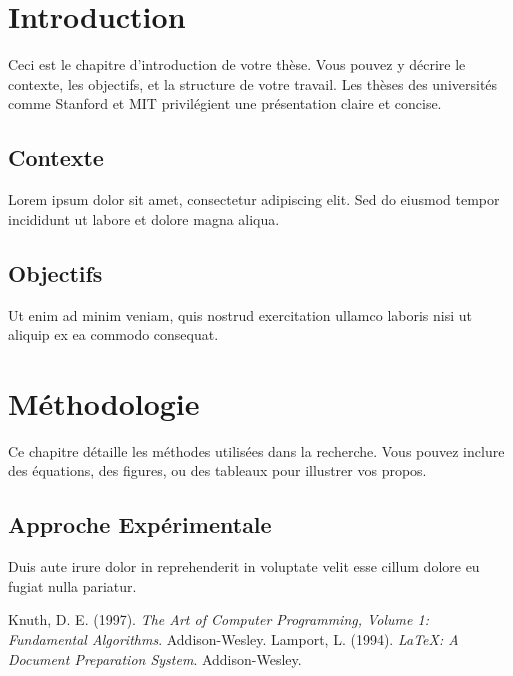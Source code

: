 \documentclass[a4paper,12pt]{report}
\begin{document}
\clearpage
\tableofcontents
\clearpage

\chapter{Introduction}
\onehalfspacing
Ceci est le chapitre d'introduction de votre thèse. Vous pouvez y décrire le contexte, les objectifs, et la structure de votre travail. Les thèses des universités comme Stanford et MIT privilégient une présentation claire et concise.

\section{Contexte}
Lorem ipsum dolor sit amet, consectetur adipiscing elit. Sed do eiusmod tempor incididunt ut labore et dolore magna aliqua.

\section{Objectifs}
Ut enim ad minim veniam, quis nostrud exercitation ullamco laboris nisi ut aliquip ex ea commodo consequat.

\chapter{Méthodologie}
\onehalfspacing
Ce chapitre détaille les méthodes utilisées dans la recherche. Vous pouvez inclure des équations, des figures, ou des tableaux pour illustrer vos propos.

\section{Approche Expérimentale}
Duis aute irure dolor in reprehenderit in voluptate velit esse cillum dolore eu fugiat nulla pariatur.

\clearpage

\begin{thebibliography}{9}
Knuth, D. E. (1997). \emph{The Art of Computer Programming, Volume 1: Fundamental Algorithms}. Addison-Wesley.
Lamport, L. (1994). \emph{\LaTeX: A Document Preparation System}. Addison-Wesley.
\end{thebibliography}
\end{document}
